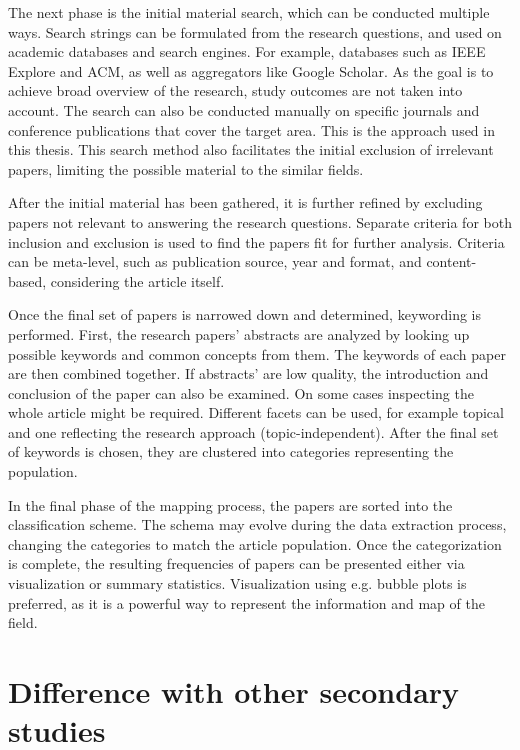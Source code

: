 \documentclass[utf8,english]{gradu3}
\begin{document}
The next phase is the initial material search, which can be conducted multiple
ways. Search strings can be formulated from the research questions, and used on
academic databases and search engines. For example, databases such as IEEE
Explore and ACM, as well as aggregators like Google Scholar. As the goal is to
achieve broad overview of the research, study outcomes are not taken into
account.
The search can also be conducted manually on specific journals and
conference publications that cover the target area. This is the approach used in
this thesis. This search method also facilitates the initial exclusion of
irrelevant papers, limiting the possible material to the similar fields.

After the initial material has been gathered, it is further refined by excluding
papers not relevant to answering the research questions. Separate criteria for
both inclusion and exclusion is used to find the papers fit for further
analysis. Criteria can be meta-level, such as publication source, year and format,
and content-based, considering the article itself.

Once the final set of papers is narrowed down and determined, keywording is
performed. First, the research papers' abstracts are analyzed by looking up
possible keywords and common concepts from them. The keywords of each paper are
then combined together. If abstracts' are low quality, the introduction and
conclusion of the paper can also be examined. On some cases inspecting the whole
article might be required.  Different facets can be used, for
example topical and one reflecting the research approach (topic-independent). 
After the final set of keywords is chosen, they are clustered into categories
representing the population.

In the final phase of the mapping process, the papers are sorted into the
classification scheme. The schema may evolve during the data extraction process,
changing the categories to match the article population. Once the categorization
is complete, the resulting frequencies of papers can be presented either via
visualization or summary statistics. Visualization using e.g. bubble plots is
preferred, as it is a powerful way to represent the information and map of the
field.


\section{Difference with other secondary studies}
\end{document}
